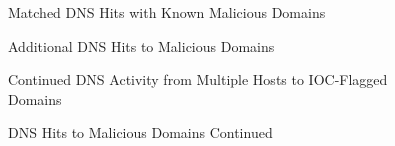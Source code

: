 \documentclass[11pt]{article}
\begin{document}
	\begin{figure}[h]
		\centering
		\caption{Matched DNS Hits with Known Malicious Domains}
		\label{fig: A2}
	\end{figure}
	
	\begin{figure}[h]
		\centering
		\caption{Additional DNS Hits to Malicious Domains}
		\label{fig: A3}
	\end{figure}
	
	\begin{figure}[h]
		\centering
		\caption{Continued DNS Activity from Multiple Hosts to IOC-Flagged Domains}
		\label{fig: A4}
	\end{figure}
	
	\begin{figure}[h]
		\centering
		\caption{DNS Hits to Malicious Domains Continued}
		\label{fig: A5}
	\end{figure}
	
\end{document}
